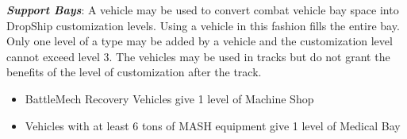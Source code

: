 \emph{\bfseries Support Bays}: A vehicle may be used to convert combat vehicle bay space into DropShip customization levels.
Using a vehicle in this fashion fills the entire bay.
Only one level of a type may be added by a vehicle and the customization level cannot exceed level 3.
The vehicles may be used in tracks but do not grant the benefits of the level of customization after the track.

\begin{itemize}

  \item BattleMech Recovery Vehicles give 1 level of Machine Shop

  \item Vehicles with at least 6 tons of MASH equipment give 1 level of Medical Bay

\end{itemize}
